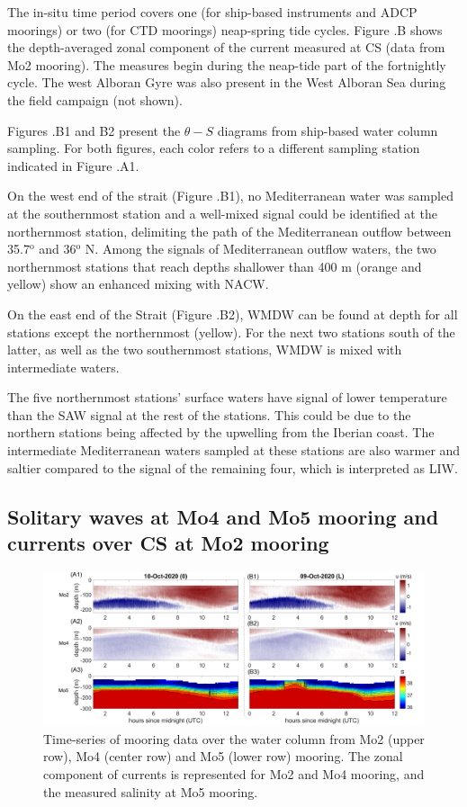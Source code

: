 The in-situ time period covers one (for ship-based instruments and ADCP moorings) or two (for CTD moorings) neap-spring tide cycles. Figure .B shows the depth-averaged zonal component of the current measured at CS (data from Mo2 mooring). The measures begin during the neap-tide part of the fortnightly cycle. The west Alboran Gyre was also present in the West Alboran Sea during the field campaign (not shown). 

Figures .B1 and B2 present the $\theta-S$ diagrams from ship-based water column sampling. For both figures, each color refers to a different sampling station indicated in Figure .A1.

On the west end of the strait (Figure .B1), no Mediterranean water was sampled at the southernmost station and a well-mixed signal could be identified at the northernmost station, delimiting the path of the Mediterranean outflow between 35.7$^{\text{o}}$ and 36$^{\text{o}}$ N. Among the signals of Mediterranean outflow waters, the two northernmost stations that reach depths shallower than 400 m (orange and yellow) show an enhanced mixing with NACW.

On the east end of the Strait (Figure .B2), WMDW can be found at depth for all stations except the northernmost (yellow). For the next two stations south of the latter, as well as the two southernmost stations, WMDW is mixed with intermediate waters. 

The five northernmost stations' surface waters have signal of lower temperature than the SAW signal at the rest of the stations. This could be due to the northern stations being affected by the upwelling from the Iberian coast. The intermediate Mediterranean waters sampled at these stations are also warmer and saltier compared to the signal of the remaining four, which is interpreted as LIW.


\subsection{Solitary waves at Mo4 and Mo5 mooring and currents over CS at Mo2 mooring}
\label{section_obs_moor}

\begin{figure}[!h]
 \includegraphics[width=\textwidth]{./GBR3D/US_moorings1.png}
 \caption [Time-series of mooring data from Mo2, Mo4 and Mo5]{Time-series of mooring data over the water column from Mo2 (upper row), Mo4 (center row) and Mo5 (lower row) mooring. The zonal component of currents is represented for Mo2 and Mo4 mooring, and the measured salinity at Mo5 mooring.}
 \label{fig_moor_US1}
\end{figure}

